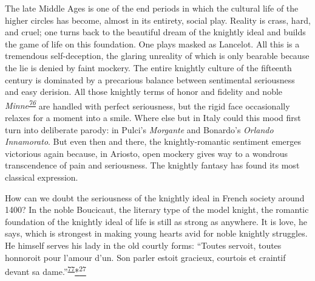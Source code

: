 The late Middle Ages is one of the end periods in which the cultural
life of the higher circles has become, almost in its entirety, social
play. Reality is crass, hard, and cruel; one turns back to the beautiful
dream of the knightly ideal and builds the game of life on this
foundation. One plays masked as Lancelot. All this is a tremendous
self-deception, the glaring unreality of which is only bearable because
the lie is denied by faint mockery. The entire knightly culture of the
fifteenth century is dominated by a precarious balance between
sentimental seriousness and easy derision. All those knightly terms of
honor and fidelity and noble
\emph{Minne\textsuperscript{\protect\hypertarget{10_Chapter_Three__THE_HEROIC_DREAM.xhtmlux5cux23id_1782}{\protect\hyperlink{23_NOTES.xhtmlux5cux23id_1783}{76}}}}
are handled with perfect seriousness, but the rigid face occasionally
relaxes for a moment into a smile. Where else but in Italy could this
mood first turn into deliberate parody: in Pulci's \emph{Morgante} and
Bonardo's \emph{Orlando Innamorato}. But even then and there, the
knightly-romantic sentiment emerges victorious again because, in
Ariosto, open mockery gives way to a wondrous transcendence of pain and
seriousness. The knightly fantasy has found its most classical
expression.

How can we doubt the seriousness of the knightly ideal in French society
around 1400? In the noble Boucicaut, the literary type of
\protect\hypertarget{10_Chapter_Three__THE_HEROIC_DREAM.xhtmlux5cux23page_86}{}{}the
model knight, the romantic foundation of the knightly ideal of life is
still as strong as anywhere. It is love, he says, which is strongest in
making young hearts avid for noble knightly struggles. He himself serves
his lady in the old courtly forms: ``Toutes servoit, toutes honnoroit
pour l'amour d'un. Son parler estoit gracieux, courtois et craintif
devant sa
dame.''\textsuperscript{\protect\hypertarget{10_Chapter_Three__THE_HEROIC_DREAM.xhtmlux5cux23id_1780}{\protect\hyperlink{23_NOTES.xhtmlux5cux23id_1781}{77}}}\protect\hypertarget{10_Chapter_Three__THE_HEROIC_DREAM.xhtmlux5cux23id_2515}{\protect\hyperlink{23_NOTES.xhtmlux5cux23id_2516}{*\textsuperscript{27}}}

